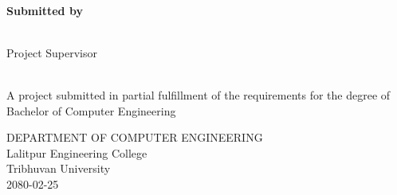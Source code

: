 \begin{center}
    \linespread{1.6}
    \thispagestyle{empty}
    \textbf{\large{\thetitle}} \\
    \vspace{2cm}

    \textbf{Submitted by} \\
    {\theauthor} \\

    \vspace{2cm}

    Project Supervisor\\
    {\thesupervisor} \\

    \vspace{2.2cm}

    A project submitted in partial fulfillment of the requirements for the degree of\\
    Bachelor of Computer Engineering

    \vspace{2.2cm}

    DEPARTMENT OF COMPUTER ENGINEERING \\
    Lalitpur Engineering College\\
    Tribhuvan University\\
    \vspace{1cm}
    2080-02-25

\end{center}
